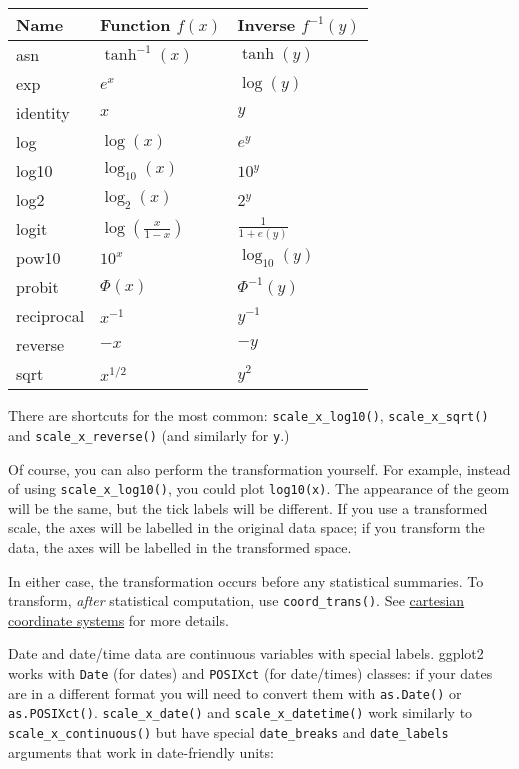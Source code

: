 \begin{longtable}[]{@{}lll@{}}
\toprule
Name & Function \(f(x)\) & Inverse \(f^{-1}(y)\)\tabularnewline
\midrule
\endhead
asn & \(\tanh^{-1}(x)\) & \(\tanh(y)\)\tabularnewline
exp & \(e ^ x\) & \(\log(y)\)\tabularnewline
identity & \(x\) & \(y\)\tabularnewline
log & \(\log(x)\) & \(e ^ y\)\tabularnewline
log10 & \(\log_{10}(x)\) & \(10 ^ y\)\tabularnewline
log2 & \(\log_2(x)\) & \(2 ^ y\)\tabularnewline
logit & \(\log(\frac{x}{1 - x})\) &
\(\frac{1}{1 + e(y)}\)\tabularnewline
pow10 & \(10^x\) & \(\log_{10}(y)\)\tabularnewline
probit & \(\Phi(x)\) & \(\Phi^{-1}(y)\)\tabularnewline
reciprocal & \(x^{-1}\) & \(y^{-1}\)\tabularnewline
reverse & \(-x\) & \(-y\)\tabularnewline
sqrt & \(x^{1/2}\) & \(y ^ 2\)\tabularnewline
\bottomrule
\end{longtable}

There are shortcuts for the most common: \texttt{scale\_x\_log10()},
\texttt{scale\_x\_sqrt()} and \texttt{scale\_x\_reverse()} (and
similarly for \texttt{y}.)  

Of course, you can also perform the transformation yourself. For
example, instead of using \texttt{scale\_x\_log10()}, you could plot
\texttt{log10(x)}. The appearance of the geom will be the same, but the
tick labels will be different. If you use a transformed scale, the axes
will be labelled in the original data space; if you transform the data,
the axes will be labelled in the transformed space.

In either case, the transformation occurs before any statistical
summaries. To transform, \emph{after} statistical computation, use
\texttt{coord\_trans()}. See \protect\hyperlink{sub:cartesian}{cartesian
coordinate systems} for more details.

Date and date/time data are continuous variables with special labels.
ggplot2 works with \texttt{Date} (for dates) and \texttt{POSIXct} (for
date/times) classes: if your dates are in a different format you will
need to convert them with \texttt{as.Date()} or \texttt{as.POSIXct()}.
  
 
\texttt{scale\_x\_date()} and \texttt{scale\_x\_datetime()} work
similarly to \texttt{scale\_x\_continuous()} but have special
\texttt{date\_breaks} and \texttt{date\_labels} arguments that work in
date-friendly units:

